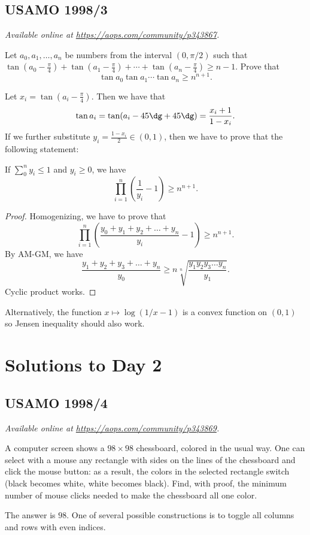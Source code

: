\documentclass[11pt]{scrartcl}
\begin{document}
\subsection{USAMO 1998/3}
\textsl{Available online at \url{https://aops.com/community/p343867}.}
\begin{mdframed}[style=mdpurplebox,frametitle={Problem statement}]
Let $a_0,a_1,\dots ,a_n$ be numbers from the interval $(0,\pi/2)$
such that $\tan (a_0-\frac{\pi}{4})+ \tan (a_1-\frac{\pi}{4})
 + \dotsb +\tan (a_n-\frac{\pi}{4}) \ge  n-1$.
Prove that
\[ \tan a_0\tan a_1 \dotsm \tan a_n \ge n^{n+1}. \]
\end{mdframed}
Let $x_i = \tan(a_i - \frac{\pi}{4})$.
Then we have that
\[ \tan a_i = \tan(a_i - 45\dg + 45\dg) = \frac{x_i + 1}{1 - x_i}. \]
If we further substitute $y_i = \frac{1 - x_i}{2} \in (0,1)$,
then we have to prove that the following statement:
\begin{claim*}
  If $\sum_0^n y_i \le 1$ and $y_i \ge 0$, we have
  \[ \prod_{i=1}^n \left( \frac{1}{y_i}-1 \right) \ge n^{n+1}. \]
\end{claim*}
\begin{proof}
  Homogenizing, we have to prove that
  \[ \prod_{i=1}^n \left( \frac{y_0+y_1+y_2+\dots+y_n}{y_i}-1 \right) \ge n^{n+1}. \]
  By AM-GM, we have
  \[ \frac{y_1+y_2+y_3+\dots+y_n}{y_0}
    \ge n \sqrt[n]{\frac{y_1y_2y_3\dots y_n}{y_1}}. \]
    Cyclic product works.
\end{proof}
\begin{remark*}
  Alternatively, the function $x \mapsto \log(1/x-1)$
  is a convex function on $(0,1)$ so Jensen inequality should also work.
\end{remark*}
\pagebreak

\section{Solutions to Day 2}
\subsection{USAMO 1998/4}
\textsl{Available online at \url{https://aops.com/community/p343869}.}
\begin{mdframed}[style=mdpurplebox,frametitle={Problem statement}]
A computer screen shows a $98 \times 98$ chessboard, colored in the usual way.
One can select with a mouse any rectangle with sides on the lines
of the chessboard and click the mouse button:
as a result, the colors in the selected rectangle switch
(black becomes white, white becomes black).
Find, with proof, the minimum number of mouse clicks
needed to make the chessboard all one color.
\end{mdframed}
The answer is $98$.
One of several possible constructions is to toggle
all columns and rows with even indices.
\end{document}
